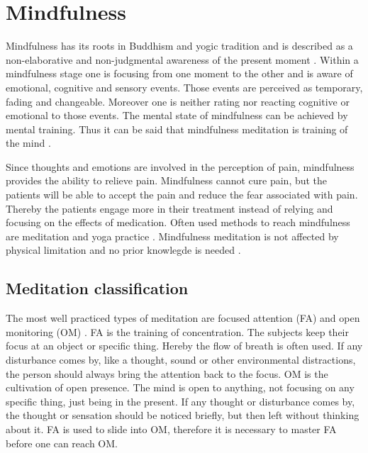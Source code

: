 \section{Mindfulness}
Mindfulness has its roots in Buddhism and yogic tradition and is described as a non-elaborative and non-judgmental awareness of the present moment \cite{Zeidan2016, Kabat1982, Zeidan2012,Tang2017}. Within a mindfulness stage one is focusing from one moment to the other and is aware of emotional, cognitive and sensory events. Those events are perceived as temporary, fading and changeable. Moreover one is neither rating nor reacting cognitive or emotional to those events. The mental state of mindfulness can be achieved by mental training. \cite{Zeidan2016, Zeidan2012}  Thus it can be said that mindfulness meditation is training of the mind \cite{Tang2017}. 

Since thoughts and emotions are involved in the perception of pain, mindfulness provides the ability to relieve pain. Mindfulness cannot cure pain, but the patients will be able to accept the pain and reduce the fear associated with pain. Thereby the patients engage more in their treatment instead of relying and focusing on the effects of medication. \cite{Jacob2016} Often used methods to reach mindfulness are meditation and yoga practice \cite{Kabat1982}.  Mindfulness meditation is not affected by physical limitation and no prior knowlegde is needed \cite{Tang2017}.


\subsection{Meditation classification}
The most well practiced types of meditation are focused attention (FA) and open monitoring (OM) \cite{Zeidan2016}. FA is the training of concentration. The subjects keep their focus at an object or specific thing. Hereby the flow of breath is often used.  If any disturbance comes by, like a thought, sound or other environmental distractions, the person should always bring the attention back to the focus. \cite{Zeidan2016} OM is the cultivation of open presence. The mind is open to anything, not focusing on any specific thing, just being in the present. If any thought or disturbance comes by, the thought or sensation should be noticed briefly, but then left without thinking about it. FA is used to slide into OM, therefore it is necessary to master FA before one can reach OM. \cite{Perlman2010, Zeidan2016, Kabat1982} 


